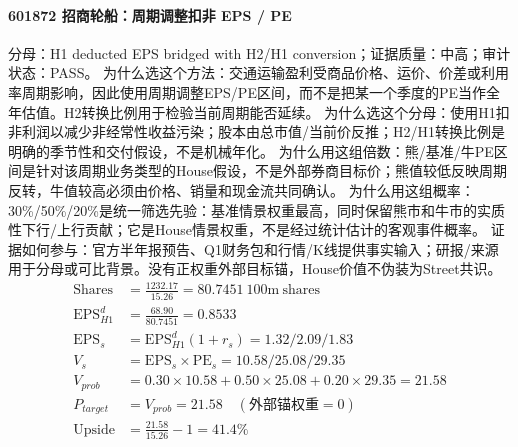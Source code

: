 \paragraph{601872 招商轮船：周期调整扣非 EPS / PE}
分母：H1 deducted EPS bridged with H2/H1 conversion；证据质量：中高；审计状态：PASS。
为什么选这个方法：交通运输盈利受商品价格、运价、价差或利用率周期影响，因此使用周期调整EPS/PE区间，而不是把某一个季度的PE当作全年估值。H2转换比例用于检验当前周期能否延续。
为什么选这个分母：使用H1扣非利润以减少非经常性收益污染；股本由总市值/当前价反推；H2/H1转换比例是明确的季节性和交付假设，不是机械年化。
为什么用这组倍数：熊/基准/牛PE区间是针对该周期业务类型的House假设，不是外部券商目标价；熊值较低反映周期反转，牛值较高必须由价格、销量和现金流共同确认。
为什么用这组概率：30\%/50\%/20\%是统一筛选先验：基准情景权重最高，同时保留熊市和牛市的实质性下行/上行贡献；它是House情景权重，不是经过统计估计的客观事件概率。
证据如何参与：官方半年报预告、Q1财务包和行情/K线提供事实输入；研报/来源用于分母或可比背景。没有正权重外部目标锚，House价值不伪装为Street共识。
\begin{align*}
\mathrm{Shares} &= \frac{1232.17}{15.26}=80.7451\ \mathrm{100m\ shares}\\
\mathrm{EPS}_{H1}^d &= \frac{68.90}{80.7451}=0.8533\\
\mathrm{EPS}_s &= \mathrm{EPS}_{H1}^d(1+r_s)=1.32/2.09/1.83\\
V_s &= \mathrm{EPS}_s\times \mathrm{PE}_s=10.58/25.08/29.35\\
V_{prob} &= 0.30\times 10.58+0.50\times 25.08+0.20\times 29.35=21.58\\
P_{target} &= V_{prob}=21.58\quad(\text{外部锚权重}=0)\\
\mathrm{Upside} &= \frac{21.58}{15.26}-1=41.4\%\\
\end{align*}

